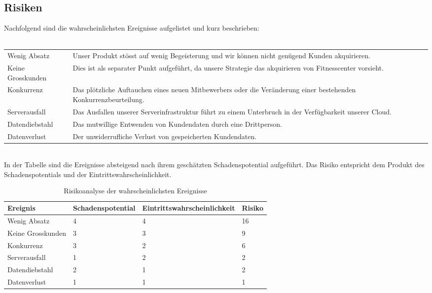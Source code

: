 \subsection{Risiken}
Nachfolgend sind die wahrscheinlichsten Ereignisse aufgelistet und kurz beschrieben:
\\ \\
\begin{tabu} to \linewidth {l X}
	Wenig Absatz & Unser Produkt stösst auf wenig Begeisterung und wir können nicht genügend Kunden akquirieren. \newline \\
	Keine Grosskunden & Dies ist als separater Punkt aufgeführt, da unsere Strategie das akquirieren von Fitnesscenter vorsieht. \newline \\
	Konkurrenz & Das plötzliche Auftauchen eines neuen Mitbewerbers oder die Veränderung einer bestehenden Konkurrenzbeurteilung. \newline \\
	Serverausfall & Das Ausfallen unserer Serverinfrastruktur führt zu einem Unterbruch in der Verfügbarkeit unserer Cloud. \newline \\
	Datendiebstahl & Das mutwillige Entwenden von Kundendaten durch eine Drittperson. \newline \\
	Datenverlust & Der unwiderrufliche Verlust von gespeicherten Kundendaten. \newline \\
\end{tabu}

\hfill \\
In der Tabelle sind die Ereignisse absteigend nach ihrem geschätzten Schadenspotential aufgeführt. Das Risiko entspricht dem Produkt des Schadenspotentials und der Eintrittswahrscheinlichkeit.
\begin{table}[h]
	\centering
	\begin{tabu} to \linewidth {l l l l}
		\toprule
		Ereignis & Schadenspotential & Eintrittswahrscheinlichkeit & Risiko \\
		\midrule
		Wenig Absatz & 4 & 4 & 16 \\
		Keine Grosskunden & 3 & 3 & 9 \\
		Konkurrenz & 3 & 2 & 6 \\
		Serverausfall & 1 & 2 & 2 \\
		Datendiebstahl & 2 & 1 & 2 \\
		Datenverlust & 1 & 1 & 1 \\
		\bottomrule
	\end{tabu}
	\label{tbl:risikoanalyse}
	\caption{Risikoanalyse der wahrscheinlichsten Ereignisse}
\end{table}

